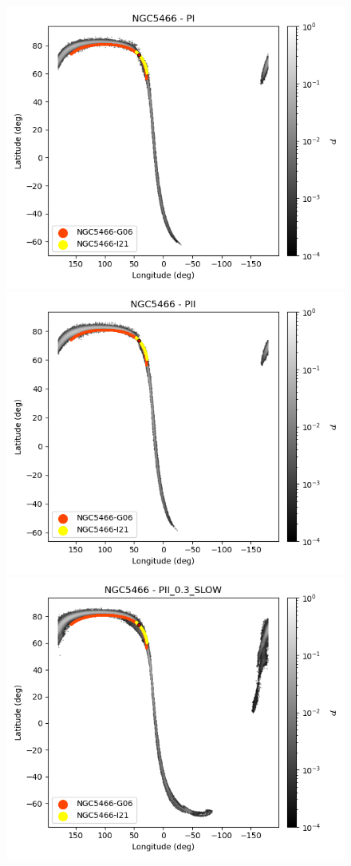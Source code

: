             \twocolumn
            \begin{figure}
                \begin{center}
                    \includegraphics[clip=true, trim = 0mm 0mm 0mm 0mm, width=0.65\columnwidth]{images/PI_individual_NGC5466_galstream-NGC5466-l-b.png}
                    \includegraphics[clip=true, trim = 0mm 0mm 0mm 0mm, width=0.65\columnwidth]{images/PII_individual_NGC5466_galstream-NGC5466-l-b.png}
                    \includegraphics[clip=true, trim = 0mm 0mm 0mm 0mm, width=0.65\columnwidth]{images/PII_0.3_SLOW_individual_NGC5466_galstream-NGC5466-l-b.png}


\end{center}
\end{figure}
